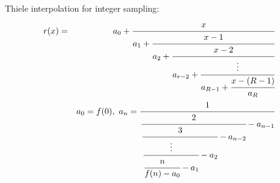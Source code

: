 \documentclass[10pt]{article}
\begin{document}
Thiele interpolation for integer sampling:
\begin{eqnarray}
\nonumber
r(x) &=& a_0 + \cfrac{x}{a_1 + \cfrac{x - 1}{a_2 + \cfrac{x- 2}{a_{r-2} + \cfrac{\vdots}{a_{R-1} + \cfrac{x-(R-1)}{a_R}}}}} \\
\nonumber
&& a_0 = f(0),~ a_n =\cfrac{1}{\cfrac{2}{\cfrac{3}{\cfrac{\vdots}{\cfrac{n}{f(n)-a_0}-a_1}-a_2} - a_{n-2}} - a_{n-1}} 
\end{eqnarray}
\end{document}
